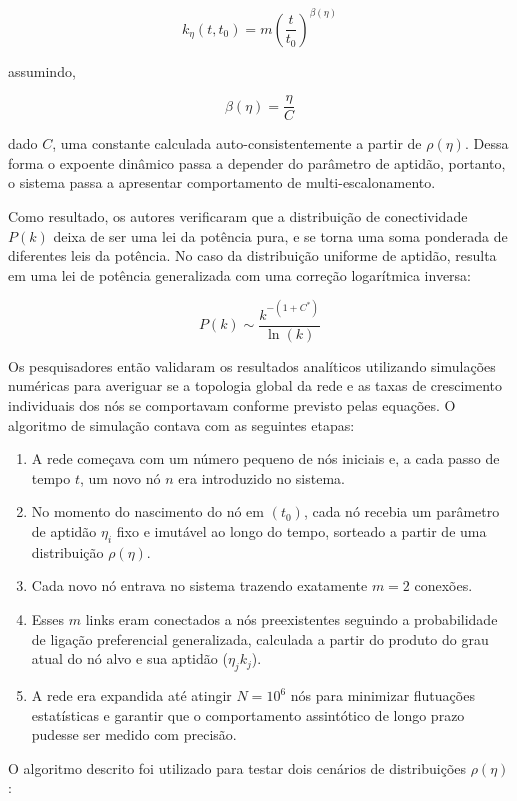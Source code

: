 \documentclass[12pt,oneside,a4paper,brazil,sumario=tradicional]{abntex2}
\begin{document}
\[k_{\eta}(t,t_{0}) = m\left(\frac{t}{t_{0}}\right)^{\beta(\eta)}\]

assumindo,

\[\beta(\eta) = \frac{\eta}{C}\]

dado $C$, uma constante calculada auto-consistentemente a partir de $\rho(\eta)$. Dessa forma o expoente dinâmico passa a depender do parâmetro de aptidão, portanto, o sistema passa a apresentar comportamento de multi-escalonamento.

Como resultado, os autores verificaram que a distribuição de conectividade $P(k)$ deixa de ser uma lei da potência pura, e se torna uma soma ponderada de diferentes leis da potência. No caso da distribuição uniforme de aptidão, resulta em uma lei de potência generalizada com uma correção logarítmica inversa:

\[P(k) \sim \frac{k^{-(1+C^{*})}}{\ln(k)}\]

Os pesquisadores então validaram os resultados analíticos utilizando simulações numéricas para averiguar se a topologia global da rede e as taxas de crescimento individuais dos nós se comportavam conforme previsto pelas equações. O algoritmo de simulação contava com as seguintes etapas:

\begin{enumerate}
  \item A rede começava com um número pequeno de nós iniciais e, a cada passo de tempo $t$, um novo nó $n$ era introduzido no sistema.
  \item No momento do nascimento do nó em $(t_{0})$, cada nó recebia um parâmetro de aptidão $\eta_{i}$ fixo e imutável ao longo do tempo, sorteado a partir de uma distribuição $\rho(\eta)$.
  \item Cada novo nó entrava no sistema trazendo exatamente $m = 2$ conexões.
  \item Esses $m$ links eram conectados a nós preexistentes seguindo a probabilidade de ligação preferencial generalizada, calculada a partir do produto do grau atual do nó alvo e sua aptidão ($\eta_{j}k_{j}$).
  \item A rede era expandida até atingir $N = 10^{6}$ nós para minimizar flutuações estatísticas e garantir que o comportamento assintótico de longo prazo pudesse ser medido com precisão.
\end{enumerate}

O algoritmo descrito foi utilizado para testar dois cenários de distribuições $\rho(\eta)$:
\end{document}

